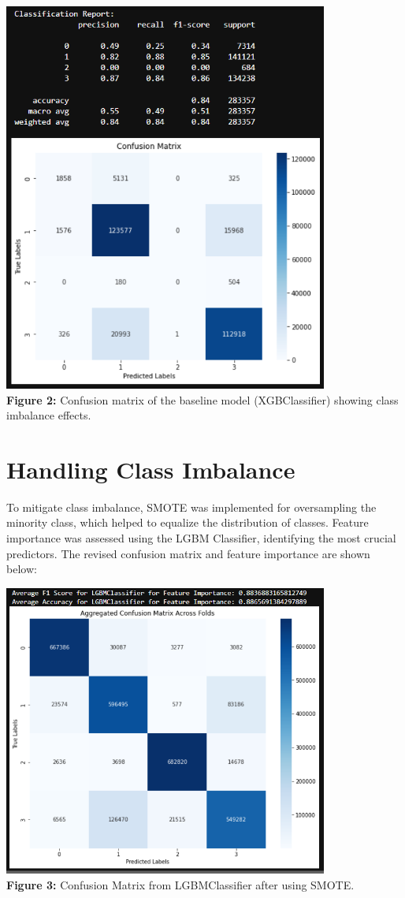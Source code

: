 \documentclass[12pt]{article}
\begin{document}
\begin{center}
    \includegraphics[width=0.8\textwidth]{baselineXGBC.png} %
    \textbf{\\Figure 2:} Confusion matrix of the baseline model (XGBClassifier) showing class imbalance effects.
\end{center}

\section*{Handling Class Imbalance}
To mitigate class imbalance, SMOTE was implemented for oversampling the minority class, which helped to equalize the distribution of classes. Feature importance was assessed using the LGBM Classifier, identifying the most crucial predictors. The revised confusion matrix and feature importance are shown below:

\begin{center}
    \includegraphics[width=0.8\textwidth]{LGBMFeatImportance.png} %
    \textbf{\\Figure 3:} Confusion Matrix from LGBMClassifier after using SMOTE.
\end{center}
\end{document}
